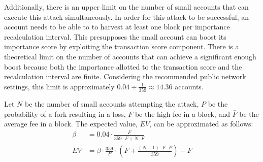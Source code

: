 Additionally, there is an upper limit on the number of small accounts that can execute this attack simultaneously.
In order for this attack to be successful, an account needs to be able to to harvest at least one block per importance recalculation interval.
This presupposes the small account can boost its importance score by exploiting the transaction score component.
There is a theoretical limit on the number of accounts that can achieve a significant enough boost because both the importance allotted to the transaction score and the recalculation interval are finite.
Considering the recommended public network settings, this limit is approximately $0.04 \div \frac{1}{359} \approx 14.36$ accounts.

Let $N$ be the number of small accounts attempting the attack, $P$ be the probability of a fork resulting in a loss, $F$ be the high fee in a block, and $\bar{F}$ be the average fee in a block.
The expected value, $EV$, can be approximated as follows:
\begin{align*}
	\tag{importance boost}\beta &= 0.04 \cdot \frac{F}{359 \cdot \bar{F} + N \cdot F} \\
	\tag{expected value} EV &= \beta \cdot \frac{359}{P} \cdot \left( \bar{F} + \frac{\left( N - 1\right ) \cdot F \cdot P}{359} \right) - F
\end{align*}

\begin{figure}[H]
\end{figure}
